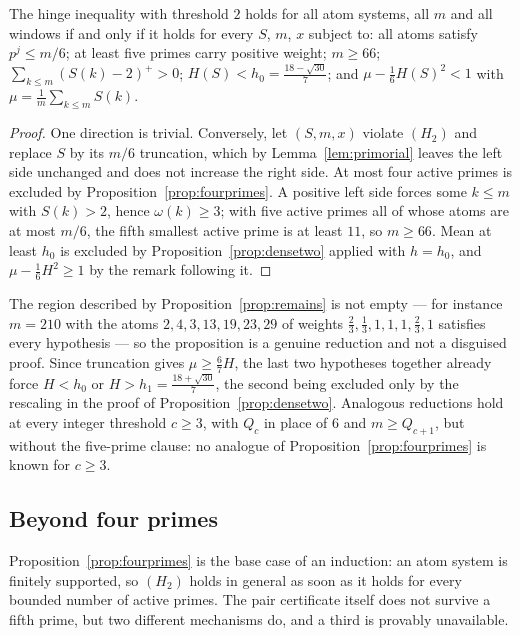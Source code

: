 \begin{proposition}\label{prop:remains}
The hinge inequality with threshold $2$ holds for all atom systems, all $m$ and all windows if and only if it holds
for every $S$, $m$, $x$ subject to: all atoms satisfy $p^j\le m/6$; at least five primes carry positive weight;
$m\ge66$; $\sum_{k\le m}(S(k)-2)^+>0$; $H(S)<h_0=\tfrac{18-\sqrt{30}}7$; and $\mu-\tfrac16H(S)^2<1$ with
$\mu=\tfrac1m\sum_{k\le m}S(k)$.
\end{proposition}
\begin{proof}
One direction is trivial. Conversely, let $(S,m,x)$ violate $(H_2)$ and replace $S$ by its $m/6$ truncation, which by
Lemma~\ref{lem:primorial} leaves the left side unchanged and does not increase the right side. At most four active
primes is excluded by Proposition~\ref{prop:fourprimes}. A positive left side forces some $k\le m$ with $S(k)>2$,
hence $\omega(k)\ge3$; with five active primes all of whose atoms are at most $m/6$, the fifth smallest active prime
is at least $11$, so $m\ge66$. Mean at least $h_0$ is excluded by Proposition~\ref{prop:densetwo} applied with
$h=h_0$, and $\mu-\tfrac16H^2\ge1$ by the remark following it.
\end{proof}

The region described by Proposition~\ref{prop:remains} is not empty --- for instance $m=210$ with the atoms
$2,4,3,13,19,23,29$ of weights $\tfrac23,\tfrac13,1,1,1,\tfrac23,1$ satisfies every hypothesis --- so the
proposition is a genuine reduction and not a disguised proof. Since truncation gives $\mu\ge\tfrac67H$, the last two
hypotheses together already force $H<h_0$ or $H>h_1=\tfrac{18+\sqrt{30}}7$, the second being excluded only by the
rescaling in the proof of Proposition~\ref{prop:densetwo}. Analogous reductions hold at every integer threshold
$c\ge3$, with $Q_c$ in place of $6$ and $m\ge Q_{c+1}$, but without the five-prime clause: no analogue of
Proposition~\ref{prop:fourprimes} is known for $c\ge3$.

\subsection*{Beyond four primes}

Proposition~\ref{prop:fourprimes} is the base case of an induction: an atom system is finitely
supported, so $(H_2)$ holds in general as soon as it holds for every bounded number of active
primes. The pair certificate itself does not survive a fifth prime, but two different mechanisms do,
and a third is provably unavailable.

